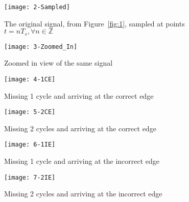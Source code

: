 \begin{figure}[ht]
\texttt{[image: 2-Sampled]}
\caption{\label{fig:2}The original signal, from Figure~\ref{fig:1}, sampled at points $t=nT_s , \forall n\in\mathbb{Z}$}
\end{figure}

\begin{figure}[ht]
\texttt{[image: 3-Zoomed\_In]}
\caption{\label{fig:3}Zoomed in view of the same signal}
\end{figure}

\begin{figure}[ht]
\texttt{[image: 4-1CE]}
\caption{\label{fig:4}Missing 1 cycle and arriving at the correct edge}
\end{figure}

\begin{figure}[ht]
\texttt{[image: 5-2CE]}
\caption{\label{fig:5}Missing 2 cycles and arriving at the correct edge}
\end{figure}

\begin{figure}[ht]
\texttt{[image: 6-1IE]}
\caption{\label{fig:6}Missing 1 cycle and arriving at the incorrect edge}
\end{figure}

\begin{figure}[ht]
\texttt{[image: 7-2IE]}
\caption{\label{fig:7}Missing 2 cycles and arriving at the incorrect edge}
\end{figure}

